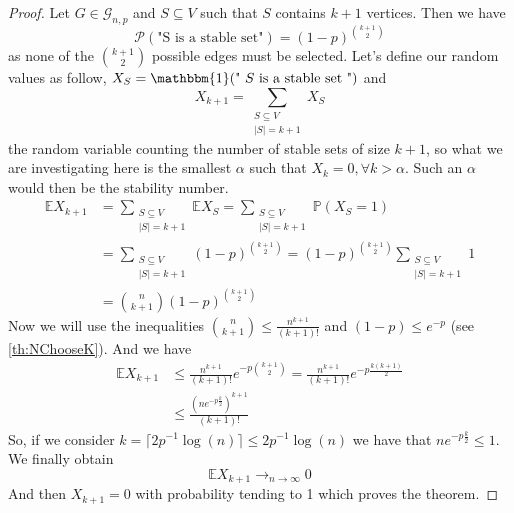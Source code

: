 \begin{proof}
	Let $G \in \mathcal{G}_{n,p}$ and $S \subseteq V$ such that $S$ contains $k+1$ vertices.
	Then we have 
	\begin{equation}
		\mathcal{P}(\text{"S is a stable set"}) = (1-p)^{\binom{k+1}{2}  }
	\end{equation}
	as none of the $\binom{k+1}{2}$ possible edges must be selected.
	\newline
	Let's define our random values as follow, $X_S = \mathbbm{1}(\text{" $S$ is a stable set "})$ and
	\begin{equation}
		X_{k+1} = \sum_{\substack{ S \subseteq V \\ |S| = k + 1}} X_S
	\end{equation}
	the random variable counting the number of stable sets of size $k+1$, so what we are investigating here is the smallest $\alpha$ such that $X_k = 0, \forall k > \alpha$. Such an $\alpha$ would then be the stability number.
	\begin{align}
		\mathbb{E}X_{k+1} &= \sum_{\substack{ S \subseteq V \\ |S| = k + 1}} \mathbb{E} X_S 	
				  = \sum_{\substack{ S \subseteq V \\ |S| = k + 1}} \mathbb{P}(X_S = 1)	\\		
		&= \sum_{\substack{ S \subseteq V \\ |S| = k + 1}} (1-p)^{\binom{k+1}{2}  }		
		= (1-p)^{\binom{k+1}{2}} \sum_{\substack{ S \subseteq V \\ |S| = k + 1}} 1 	\\	
		&= \binom{n}{k+1} (1-p)^{\binom{k+1}{2}} 
	\end{align}
	Now we will use the inequalities $  \binom{n}{k+1} \leq \frac{n^{k+1}}{(k+1)!} $ and $(1-p) \leq e^{-p}$ (see \ref{th:NChooseK}). 
	And we have
	\begin{align}
		\mathbb{E}X_{k+1} 	&\leq  \frac{n^{k+1}}{(k+1)!} e^{-p \binom{k+1}{2}} = \frac{n^{k+1}}{(k+1)!} e^{-p \frac{k(k+1)}{2}}\\
									     &\leq  \frac{(ne^{-p\frac{k}{2}})^{k+1}}{(k+1)!}
	\end{align}
	So, if we consider $k = \lceil 2p^{-1}\log(n)\rceil \leq 2p^{-1}\log(n)$ we have that $ ne^{-p\frac{k}{2}} \leq 1$.
	We finally obtain 
	\begin{equation}
		\mathbb{E} X_{k+1} \longrightarrow_{n \to \infty} 0
	\end{equation}
	And then $X_{k+1} = 0$ with probability tending to 1 which proves the theorem.

\end{proof}

